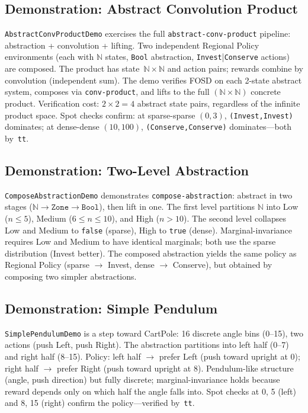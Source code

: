 \documentclass[9pt,a4paper]{article}
\theoremstyle{plain}
\theoremstyle{definition}
\theoremstyle{remark}
\begin{document}
\subsection{Demonstration: Abstract Convolution Product}

\texttt{AbstractConvProductDemo} exercises the full \texttt{abstract-conv-product} pipeline: abstraction + convolution + lifting.  Two independent Regional Policy environments (each with $\mathbb{N}$ states, \texttt{Bool} abstraction, \texttt{Invest}|\texttt{Conserve} actions) are composed.  The product has state~$\mathbb{N} \times \mathbb{N}$ and action pairs; rewards combine by convolution (independent sum).  The demo verifies FOSD on each 2-state abstract system, composes via \texttt{conv-product}, and lifts to the full $(\mathbb{N} \times \mathbb{N})$ concrete product.  Verification cost: $2 \times 2 = 4$ abstract state pairs, regardless of the infinite product space.  Spot checks confirm: at sparse-sparse $(0,3)$, \texttt{(Invest,Invest)} dominates; at dense-dense $(10,100)$, \texttt{(Conserve,Conserve)} dominates---both by~\texttt{tt}.

\subsection{Demonstration: Two-Level Abstraction}

\texttt{ComposeAbstractionDemo} demonstrates \texttt{compose-abstraction}: abstract in two stages ($\mathbb{N} \to \texttt{Zone} \to \texttt{Bool}$), then lift in one.  The first level partitions $\mathbb{N}$ into Low ($n \le 5$), Medium ($6 \le n \le 10$), and High ($n > 10$).  The second level collapses Low and Medium to \texttt{false} (sparse), High to \texttt{true} (dense).  Marginal-invariance requires Low and Medium to have identical marginals; both use the sparse distribution (Invest better).  The composed abstraction yields the same policy as Regional Policy (sparse $\to$ Invest, dense $\to$ Conserve), but obtained by composing two simpler abstractions.

\subsection{Demonstration: Simple Pendulum}

\texttt{SimplePendulumDemo} is a step toward CartPole: 16 discrete angle bins (0--15), two actions (push Left, push Right).  The abstraction partitions into left half (0--7) and right half (8--15).  Policy: left half $\to$ prefer Left (push toward upright at 0); right half $\to$ prefer Right (push toward upright at 8).  Pendulum-like structure (angle, push direction) but fully discrete; marginal-invariance holds because reward depends only on which half the angle falls into.  Spot checks at 0, 5 (left) and 8, 15 (right) confirm the policy---verified by~\texttt{tt}.
\end{document}
